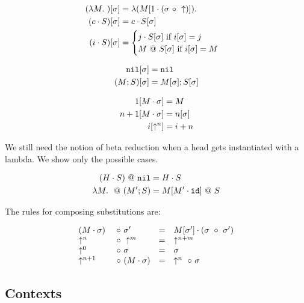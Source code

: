 \documentclass[11pt,twoside]{article}
\begin{document}
\begin{align*} 
(\lambda M.\ )[\sigma] &= \lambda (M[1\cdot(\sigma~\circ~\uparrow)]).\ \\
(c\cdot S)[\sigma] &= c\cdot S[\sigma] \\
(i\cdot S)[\sigma] &= \begin{cases}
                     j\cdot S[\sigma] \mbox{\ if $i[\sigma] = j$} \\
                     M ~@~ S[\sigma]\mbox{\ if $i[\sigma] = M$}
                   \end{cases} 
\end{align*} 


\begin{align*} 
\mathtt{nil}[\sigma] &= \mathtt{nil}\\
(M;S)[\sigma] &= M[\sigma];S[\sigma]
\end{align*} 


\begin{align*} 
1[M\cdot\sigma] &= M\\
n+1[M\cdot\sigma] &= n[\sigma]\\
i[\uparrow^n] &= i+n\\
\end{align*} 

We still need the notion of beta reduction when a 
head gets instantiated with a lambda.  We show
only the possible cases.

\bigskip 
{}

\begin{align*} 
(H\cdot S)~@~\mathtt{nil} &= H\cdot S\\
\lambda M.\ ~@~(M';S) &= M[M'\cdot\mathtt{id}]~@~ S
\end{align*} 

The rules for composing substitutions are:

\bigskip 
{}

$$
\begin{array}{llll}
(M\cdot \sigma) & ~\circ~ \sigma' &= &M[\sigma']\cdot (\sigma~\circ~\sigma') \\
\uparrow^n & ~\circ~ \uparrow^m &= &\uparrow^{n+m}\\
\uparrow^0 & ~\circ~ \sigma &= &\sigma\\
\uparrow^{n+1}&~\circ~ (M\cdot\sigma) &= &\uparrow^n~\circ~\sigma
\end{array} 
$$

\subsection{Contexts}
\end{document}
